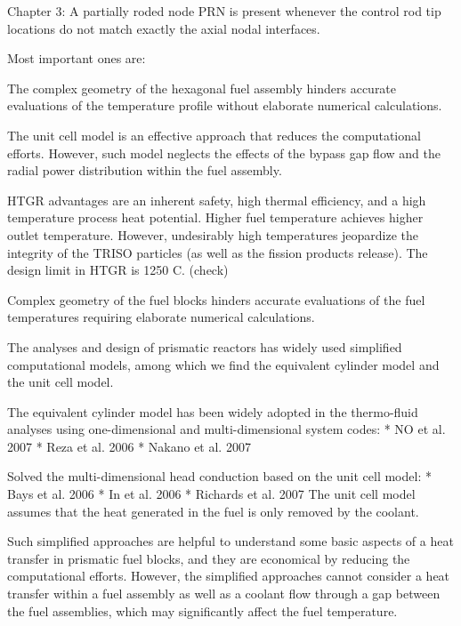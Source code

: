 Chapter 3:
A partially roded node PRN is present whenever the control rod tip locations do not match exactly the axial nodal interfaces.


Most important ones are:



The complex geometry of the hexagonal fuel assembly hinders accurate evaluations of the temperature profile  without elaborate numerical calculations.

The unit cell model is an effective approach that reduces the computational efforts.
However, such model neglects the effects of the bypass gap flow and the radial power distribution within the fuel assembly.

HTGR advantages are an inherent safety, high thermal efficiency, and a high temperature process heat potential.
Higher fuel temperature achieves higher outlet temperature.
However, undesirably high temperatures jeopardize the integrity of the TRISO particles (as well as the fission products release).
The design limit in HTGR is 1250 C. (check)

Complex geometry of the fuel blocks hinders accurate evaluations of the fuel temperatures requiring elaborate numerical calculations.

The analyses and design of prismatic reactors has widely used simplified computational models, among which we find the equivalent cylinder model and the unit cell model.

The equivalent cylinder model has been widely adopted in the thermo-fluid analyses using one-dimensional and multi-dimensional system codes:
* NO et al. 2007 %
* Reza et al. 2006 %
* Nakano et al. 2007 %

Solved the multi-dimensional head conduction based on the unit cell model:
* Bays et al. 2006
* In et al. 2006 %
* Richards et al. 2007 %
The unit cell model assumes that the heat generated in the fuel is only removed by the coolant.

Such simplified approaches are helpful to understand some basic aspects of a heat transfer in prismatic fuel blocks, and they are economical by reducing the computational efforts.
However, the simplified approaches cannot consider a heat transfer within a fuel assembly as well as a coolant flow through a gap between the fuel assemblies, which may significantly affect the fuel temperature.


